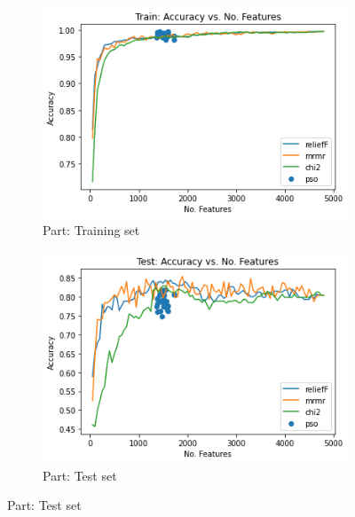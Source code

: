 \documentclass[runningheads]{llncs}
\begin{document}
\begin{figure}[htb]
  \centering
  \caption[Two numerical solutions]{
      FS Classification Accuracy per $k$
    }
  \begin{subfigure}[b]{.55\linewidth}
    \includegraphics[width=\linewidth]{accuracy-features-part-train.png}
    \caption{Part: Training set}\label{fig:accuracy-features-part-train}
  \end{subfigure}
  \begin{subfigure}[b]{.55\linewidth}
    \includegraphics[width=\linewidth]{accuracy-features-part-test.png}
    \caption{Part: Test set}\label{fig:accuracy-features-part-test}
  \end{subfigure}
  \label{fig:accuracy-features-part-train}
\end{figure}
\end{document}
